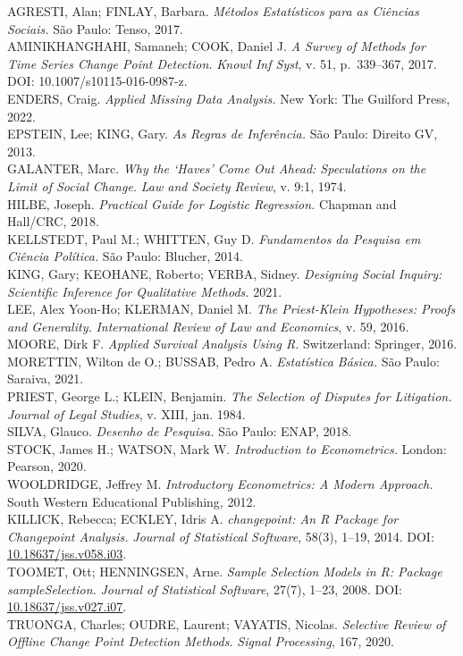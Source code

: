 \documentclass[
  letterpaper,
  DIV=11,
  numbers=noendperiod]{scrreprt}
\begin{document}
AGRESTI, Alan; FINLAY, Barbara. \emph{Métodos Estatísticos para as
Ciências Sociais.} São Paulo: Tenso, 2017.\\
AMINIKHANGHAHI, Samaneh; COOK, Daniel J. \emph{A Survey of Methods for
Time Series Change Point Detection.} \emph{Knowl Inf Syst}, v. 51,
p.~339--367, 2017. DOI: 10.1007/s10115-016-0987-z.\\
ENDERS, Craig. \emph{Applied Missing Data Analysis.} New York: The
Guilford Press, 2022.\\
EPSTEIN, Lee; KING, Gary. \emph{As Regras de Inferência.} São Paulo:
Direito GV, 2013.\\
GALANTER, Marc. \emph{Why the `Haves' Come Out Ahead: Speculations on
the Limit of Social Change.} \emph{Law and Society Review}, v. 9:1,
1974.\\
HILBE, Joseph. \emph{Practical Guide for Logistic Regression.} Chapman
and Hall/CRC, 2018.\\
KELLSTEDT, Paul M.; WHITTEN, Guy D. \emph{Fundamentos da Pesquisa em
Ciência Política.} São Paulo: Blucher, 2014.\\
KING, Gary; KEOHANE, Roberto; VERBA, Sidney. \emph{Designing Social
Inquiry: Scientific Inference for Qualitative Methods.} 2021.\\
LEE, Alex Yoon-Ho; KLERMAN, Daniel M. \emph{The Priest-Klein Hypotheses:
Proofs and Generality.} \emph{International Review of Law and
Economics}, v. 59, 2016.\\
MOORE, Dirk F. \emph{Applied Survival Analysis Using R.} Switzerland:
Springer, 2016.\\
MORETTIN, Wilton de O.; BUSSAB, Pedro A. \emph{Estatística Básica.} São
Paulo: Saraiva, 2021.\\
PRIEST, George L.; KLEIN, Benjamin. \emph{The Selection of Disputes for
Litigation.} \emph{Journal of Legal Studies}, v. XIII, jan. 1984.\\
SILVA, Glauco. \emph{Desenho de Pesquisa.} São Paulo: ENAP, 2018.\\
STOCK, James H.; WATSON, Mark W. \emph{Introduction to Econometrics.}
London: Pearson, 2020.\\
WOOLDRIDGE, Jeffrey M. \emph{Introductory Econometrics: A Modern
Approach.} South Western Educational Publishing, 2012.\\
KILLICK, Rebecca; ECKLEY, Idris A. \emph{changepoint: An R Package for
Changepoint Analysis.} \emph{Journal of Statistical Software}, 58(3),
1--19, 2014. DOI:
\href{https://doi.org/10.18637/jss.v058.i03}{10.18637/jss.v058.i03}.\\
TOOMET, Ott; HENNINGSEN, Arne. \emph{Sample Selection Models in R:
Package sampleSelection.} \emph{Journal of Statistical Software}, 27(7),
1--23, 2008. DOI:
\href{https://doi.org/10.18637/jss.v027.i07}{10.18637/jss.v027.i07}.\\
TRUONGA, Charles; OUDRE, Laurent; VAYATIS, Nicolas. \emph{Selective
Review of Offline Change Point Detection Methods.} \emph{Signal
Processing}, 167, 2020.
\end{document}
